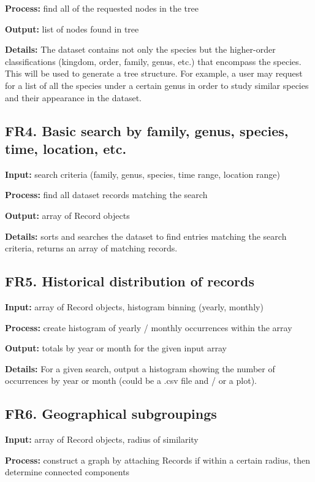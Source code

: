 \documentclass{article}
\begin{document}
\noindent \textbf{Process:} find all of the requested nodes in the tree

\noindent \textbf{Output:} list of nodes found in tree

\noindent \textbf{Details:} The dataset contains not only the species but the higher-order classifications (kingdom, order, family, genus, etc.) that encompass the species. This will be used to generate a tree structure. For example, a user may request for a list of all the species under a certain genus in order to study similar species and their appearance in the dataset.

\subsection{FR4. Basic search by family, genus, species, time, location, etc.}
\noindent \textbf{Input:} search criteria (family, genus, species, time range, location range)

\noindent \textbf{Process:} find all dataset records matching the search

\noindent \textbf{Output:} array of Record objects

\noindent \textbf{Details:} sorts and searches the dataset to find entries matching the search criteria, returns an array of matching records.

\subsection{FR5. Historical distribution of records}
\noindent \textbf{Input:} array of Record objects, histogram binning (yearly, monthly)

\noindent \textbf{Process:} create histogram of yearly / monthly occurrences within the array

\noindent \textbf{Output:} totals by year or month for the given input array

\noindent \textbf{Details:} For a given search, output a histogram showing the number of occurrences by year or month (could be a .csv file and / or a plot).

\subsection{FR6. Geographical subgroupings}
\noindent \textbf{Input:} array of Record objects, radius of similarity

\noindent \textbf{Process:} construct a graph by attaching Records if within a certain radius, then determine connected components
\end{document}
